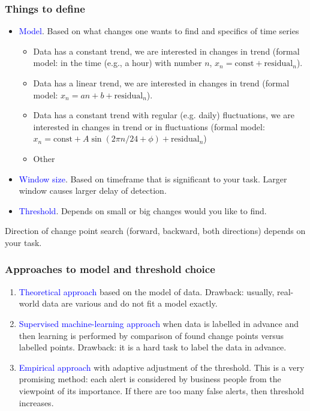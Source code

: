 \documentclass[intlimits, 9pt, unicode]{beamer}
\newcommand{\textblue}[1]{\textcolor{blue}{#1}}
\begin{document}
\begin{frame}
    \frametitle{Things to define}
	
	\begin{itemize}
	    	\item \textblue{Model}. Based on what changes one wants  to find and specifics of time series
			\begin{itemize}
			\item Data has a constant trend, we are interested in changes in trend (formal model: in the time (e.g., a hour) with number $n$, $x_n = \mathrm{const} + \mathrm{residual}_n$).
\smallskip
			\item Data has a linear trend, we are interested in changes in trend (formal model: $x_n = an+b + \mathrm{residual}_n$).
\smallskip
			\item Data has a constant trend with regular (e.g. daily) fluctuations, we are interested in changes in trend or in fluctuations (formal model: $x_n = \mathrm{const} + A\sin(2\pi n/24+\phi) + \mathrm{residual}_n$)
\smallskip			
            \item Other
			\end{itemize}
\medskip
		\item \textblue{Window size}. Based on timeframe that is significant to your task. Larger window causes larger delay of detection.
\medskip
		\item \textblue{Threshold}. Depends on small or big changes would you like to find.
	    \end{itemize}

\bigskip
		Direction of change point search (forward, backward, both directions) depends on your task.


 \end{frame}

\begin{frame}
    \frametitle{Approaches to model and threshold choice}

\begin{enumerate}
\item
\textblue{Theoretical approach} based on the model of data. Drawback: usually, real-world data are various and do not fit a model exactly.

\bigskip
\item
\textblue{Supervised machine-learning approach} when data is labelled in advance and then learning is performed by comparison of found change points versus labelled points. Drawback: it is a hard task to label the data in advance.

\bigskip
\item
\textblue{Empirical approach} with adaptive adjustment of the threshold. This is a very promising method:
each alert is considered by business people from the viewpoint of its
importance. If there are too many false alerts, then threshold increases.
\end{enumerate}
 \end{frame}
\end{document}
